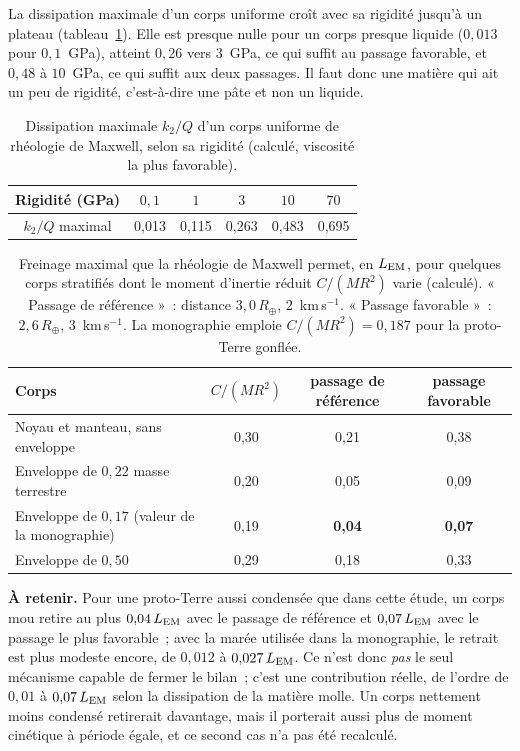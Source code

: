 \documentclass[11pt,a4paper]{article}
\newcommand{\Rt}{\ensuremath{R_\oplus}}
\newcommand{\LEM}{\ensuremath{L_{\rm EM}}}
\begin{document}
La dissipation maximale d'un corps uniforme croît avec sa rigidité jusqu'à un plateau (tableau~\ref{tab:rigidite}). Elle est presque nulle pour un corps presque liquide ($0{,}013$ pour $0{,}1$~GPa), atteint $0{,}26$ vers $3$~GPa, ce qui suffit au passage favorable, et $0{,}48$ à $10$~GPa, ce qui suffit aux deux passages. Il faut donc une matière qui ait un peu de rigidité, c'est-à-dire une pâte et non un liquide.

\begin{table}[htbp]
\centering
\caption{Dissipation maximale $k_2/Q$ d'un corps uniforme de rhéologie de Maxwell, selon sa rigidité (calculé, viscosité la plus favorable).\label{tab:rigidite}}
\small
\begin{tabular}{cccccc}
\toprule
Rigidité (GPa) & $0{,}1$ & $1$ & $3$ & $10$ & $70$ \\
\midrule
$k_2/Q$ maximal & 0,013 & 0,115 & 0,263 & 0,483 & 0,695 \\
\bottomrule
\end{tabular}
\end{table}

\begin{table}[htbp]
\centering
\caption{Freinage maximal que la rhéologie de Maxwell permet, en $\LEM$, pour quelques corps stratifiés dont le moment d'inertie réduit $C/(MR^2)$ varie (calculé). « Passage de référence »~: distance $3{,}0\,\Rt$, $2$~km\,s$^{-1}$. « Passage favorable »~: $2{,}6\,\Rt$, $3$~km\,s$^{-1}$. La monographie emploie $C/(MR^2)=0{,}187$ pour la proto-Terre gonflée.\label{tab:interieur}}
\small
\begin{tabular}{lccc}
\toprule
Corps & $C/(MR^2)$ & passage de référence & passage favorable \\
\midrule
Noyau et manteau, sans enveloppe & 0,30 & 0,21 & 0,38 \\
Enveloppe de $0{,}22$ masse terrestre & 0,20 & 0,05 & 0,09 \\
Enveloppe de $0{,}17$ (valeur de la monographie) & 0,19 & \textbf{0,04} & \textbf{0,07} \\
Enveloppe de $0{,}50$ & 0,29 & 0,18 & 0,33 \\
\bottomrule
\end{tabular}
\end{table}

\textbf{À retenir.} Pour une proto-Terre aussi condensée que dans cette étude, un corps mou retire au plus $0{,}04\,\LEM$ avec le passage de référence et $0{,}07\,\LEM$ avec le passage le plus favorable~; avec la marée utilisée dans la monographie, le retrait est plus modeste encore, de $0{,}012$ à $0{,}027\,\LEM$. Ce n'est donc \emph{pas} le seul mécanisme capable de fermer le bilan~; c'est une contribution réelle, de l'ordre de $0{,}01$ à $0{,}07\,\LEM$ selon la dissipation de la matière molle. Un corps nettement moins condensé retirerait davantage, mais il porterait aussi plus de moment cinétique à période égale, et ce second cas n'a pas été recalculé.
\end{document}
